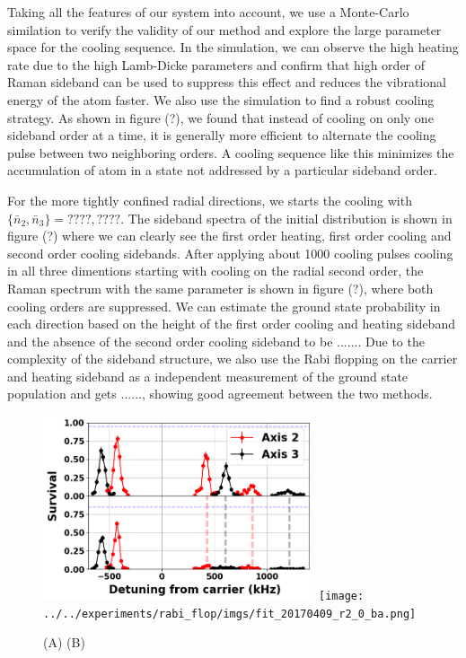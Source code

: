 \documentclass[aps,twocolumn,secnumarabic,balancelastpage,amsmath,amssymb,nofootinbib]{revtex4}
\begin{document}

Taking all the features of our system into account, we use a Monte-Carlo similation to verify
the validity of our method and explore the large parameter space for the cooling sequence.
In the simulation, we can observe the high heating rate due to the high Lamb-Dicke parameters
and confirm that high order of Raman sideband can be used to suppress this effect and reduces
the vibrational energy of the atom faster.
We also use the simulation to find a robust cooling strategy. As shown in figure (?),
we found that instead of cooling on only one sideband order at a time, it is generally more
efficient to alternate the cooling pulse between two neighboring orders. A cooling sequence
like this minimizes the accumulation of atom in a state not addressed by a particular sideband order.

For the more tightly confined radial directions, we starts the cooling with $\{\bar n_2, \bar n_3\}=????, ????$. The sideband spectra of the initial distribution is shown in figure (?) where we can clearly see the first order heating, first order cooling and second order cooling sidebands. After applying about 1000 cooling pulses cooling in all three dimentions starting with cooling on the radial second order, the Raman spectrum with the same parameter is shown in figure (?), where both cooling orders are suppressed. We can estimate the ground state probability in each direction based on the height of the first order cooling and heating sideband and the absence of the second order cooling sideband to be $......$. Due to the complexity of the sideband structure, we also use the Rabi flopping on the carrier and heating sideband as a independent measurement of the ground state population and gets $......$, showing good agreement between the two methods.

\begin{figure}
  \includegraphics[width=8cm]{imgs/spectrum_r.png}
  \texttt{[image: ../../experiments/rabi\_flop/imgs/fit\_20170409\_r2\_0\_ba.png]}
  \caption{(A) (B)}
  \label{f-radial}
\end{figure}
\end{document}
